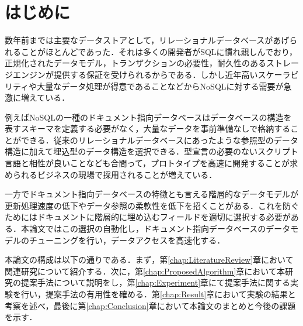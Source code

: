 \documentclass[a4paper,11pt]{ujreport}
\begin{document}
\chapter{はじめに}
\label{chap:Introduction}

数年前までは主要なデータストアとして，リレーショナルデータベースがあげられることがほとんどであった．それは多くの開発者がSQLに慣れ親しんでおり，正規化されたデータモデル，トランザクションの必要性，耐久性のあるストレージエンジンが提供する保証を受けられるからである\cite{Sky株式会社201212}．しかし近年高いスケーラビリティや大量なデータ処理が得意であることなどからNoSQLに対する需要が急激に増えている．

例えばNoSQLの一種のドキュメント指向データベースはデータベースの構造を表すスキーマを定義する必要がなく，大量なデータを事前準備なしで格納することができる．従来のリレーショナルデータベースにあったような参照型のデータ構造に加えて埋込型のデータ構造を選択できる．型宣言の必要のないスクリプト言語と相性が良いことなども合間って，プロトタイプを高速に開発することが求められるビジネスの現場で採用されることが増えている\cite{渡部201602}．

一方でドキュメント指向データベースの特徴とも言える階層的なデータモデルが更新処理速度の低下やデータ参照の柔軟性を低下を招くことがある．これを防ぐためにはドキュメントに階層的に埋め込むフィールドを適切に選択する必要がある．本論文ではこの選択の自動化し，ドキュメント指向データベースのデータモデルのチューニングを行い，データアクセスを高速化する．

本論文の構成は以下の通りである．まず，第\ref{chap:LiteratureReview}章において関連研究について紹介する．次に，第\ref{chap:ProposedAlgorithm}章において本研究の提案手法について説明をし，第\ref{chap:Experiment}章にて提案手法に関する実験を行い，提案手法の有用性を確める．第\ref{chap:Result}章において実験の結果と考察を述べ，最後に第\ref{chap:Conclusion}章において本論文のまとめと今後の課題を示す．
\end{document}
